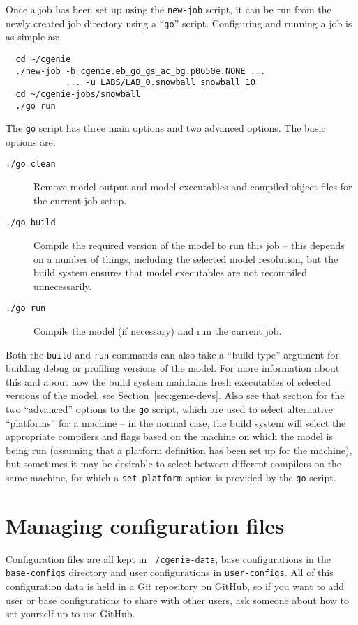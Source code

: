\documentclass[a4paper,10pt,article]{memoir}
\begin{document}
Once a job has been set up using the \texttt{new-job} script, it can
be run from the newly created job directory using a ``\texttt{go}''
script.  Configuring and running a job is as simple as:
\begin{verbatim}
  cd ~/cgenie
  ./new-job -b cgenie.eb_go_gs_ac_bg.p0650e.NONE ...
            ... -u LABS/LAB_0.snowball snowball 10
  cd ~/cgenie-jobs/snowball
  ./go run
\end{verbatim}
The \texttt{go} script has three main options and two advanced
options.  The basic options are:
\begin{description}
  \item[\texttt{./go clean}]{Remove model output and model executables
    and compiled object files for the current job setup.}
  \item[\texttt{./go build}]{Compile the required version of the model
    to run this job -- this depends on a number of things, including
    the selected model resolution, but the build system ensures that
    model executables are not recompiled unnecessarily.}
  \item[\texttt{./go run}]{Compile the model (if necessary) and run
    the current job.}
\end{description}
Both the \texttt{build} and \texttt{run} commands can also take a
``build type'' argument for building debug or profiling versions of
the model.  For more information about this and about how the build
system maintains fresh executables of selected versions of the model,
see Section~\ref{sec:genie-devs}.  Also see that section for the two
``advanced'' options to the \texttt{go} script, which are used to
select alternative ``platforms'' for a machine -- in the normal case,
the build system will select the appropriate compilers and flags based
on the machine on which the model is being run (assuming that a
platform definition has been set up for the machine), but sometimes it
may be desirable to select between different compilers on the same
machine, for which a \texttt{set-platform} option is provided by the
\texttt{go} script.

\section{Managing configuration files}

Configuration files are all kept in \texttt{~/cgenie-data}, base
configurations in the \texttt{base-configs} directory and user
configurations in \texttt{user-configs}.  All of this configuration
data is held in a Git repository on GitHub, so if you want to add user
or base configurations to share with other users, ask someone about
how to set yourself up to use GitHub.
\end{document}
